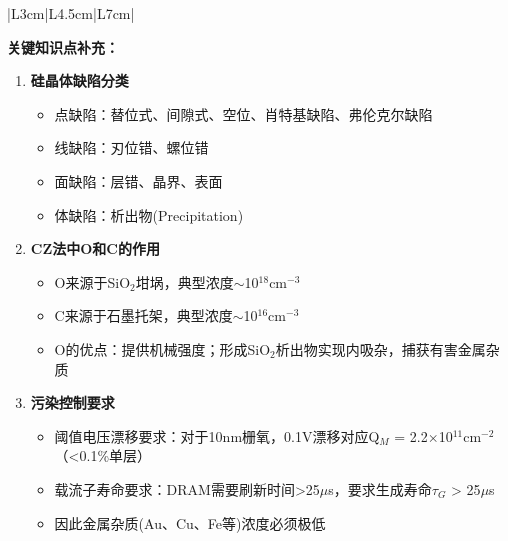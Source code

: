 \documentclass[UTF8,12pt,a4paper]{ctexart}
\begin{document}
\begin{longtable}{|L{3cm}|L{4.5cm}|L{7cm}|}
\caption{晶圆制造与清洗工艺流程总结表}
\label{tab:wafer-process}
\end{longtable}

\textbf{关键知识点补充：}

\begin{enumerate}
\item \textbf{硅晶体缺陷分类}
\begin{itemize}
    \item 点缺陷：替位式、间隙式、空位、肖特基缺陷、弗伦克尔缺陷
    \item 线缺陷：刃位错、螺位错
    \item 面缺陷：层错、晶界、表面
    \item 体缺陷：析出物(Precipitation)
\end{itemize}

\item \textbf{CZ法中O和C的作用}
\begin{itemize}
    \item O来源于SiO$_2$坩埚，典型浓度$\sim$10$^{18}$cm$^{-3}$
    \item C来源于石墨托架，典型浓度$\sim$10$^{16}$cm$^{-3}$
    \item O的优点：提供机械强度；形成SiO$_2$析出物实现内吸杂，捕获有害金属杂质
\end{itemize}

\item \textbf{污染控制要求}
\begin{itemize}
    \item 阈值电压漂移要求：对于10nm栅氧，0.1V漂移对应Q$_M$ = 2.2$\times$10$^{11}$cm$^{-2}$（<0.1\%单层）
    \item 载流子寿命要求：DRAM需要刷新时间>25$\mu$s，要求生成寿命$\tau_G$ > 25$\mu$s
    \item 因此金属杂质(Au、Cu、Fe等)浓度必须极低
\end{itemize}
\end{enumerate}
\end{document}
